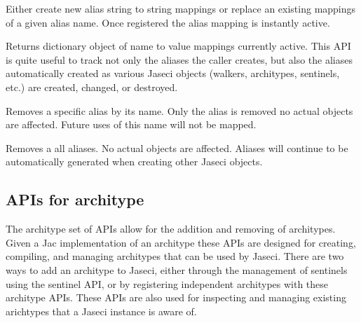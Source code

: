 {Either create new alias string to string mappings or replace
an existing mappings of a given alias name. Once registered the
alias mapping is instantly active.\vspace{4mm}\par
{}}
{Returns dictionary object of name to value mappings currently active.
This API is quite useful to track not only the aliases the caller
creates, but also the aliases automatically created as various Jaseci
objects (walkers, architypes, sentinels, etc.) are created, changed,
or destroyed.}
{Removes a specific alias by its name. Only the alias is removed no
actual objects are affected. Future uses of this name will not be
mapped.\vspace{4mm}\par
{}}
{Removes a all aliases. No actual objects are affected. Aliases will
continue to be automatically generated when creating other Jaseci
objects.}
\subsection{APIs for architype}

\par
The architype set of APIs allow for the addition and removing of
architypes. Given a Jac implementation of an architype these APIs are
designed for creating, compiling, and managing architypes that can be
used by Jaseci. There are two ways to add an architype to Jaseci, either
through the management of sentinels using the sentinel API, or by
registering independent architypes with these architype APIs. These
APIs are also used for inspecting and managing existing arichtypes that
a Jaseci instance is aware of.

